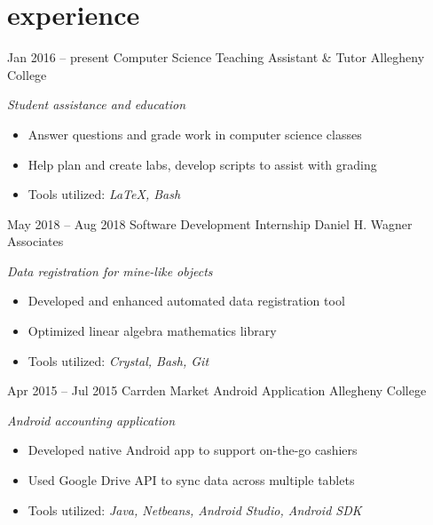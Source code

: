 \documentclass[]{friggeri-cv}
\begin{document}
\section{experience}
\begin{entrylist}
  \entry
    {Jan 2016 -- present}
    {Computer Science Teaching Assistant \& Tutor}
    {Allegheny College}
    {\emph{Student assistance and education}
    \begin{itemize}[leftmargin=1.2em]
    \item Answer questions and grade work in computer science classes
    \item Help plan and create labs, develop scripts to assist with grading
    \item Tools utilized: \emph{\LaTeX , Bash}
    \end{itemize}}
  \entry
    {May 2018 -- Aug 2018}
    {Software Development Internship}
    {Daniel H. Wagner Associates}
    {\emph{Data registration for mine-like objects}
    \begin{itemize}[leftmargin=1.2em]
    \item Developed and enhanced automated data registration tool
    \item Optimized linear algebra mathematics library
    \item Tools utilized: \emph{Crystal, Bash, Git}
    \end{itemize}}
  \entry
    {Apr 2015 -- Jul 2015}
    {Carrden Market Android Application}
    {Allegheny College}
    {\emph{Android accounting application}
    \begin{itemize}[leftmargin=1.2em]
    \item Developed native Android app to support on-the-go cashiers
    \item Used Google Drive API to sync data across multiple tablets
    \item Tools utilized: \emph{Java, Netbeans, Android Studio, Android SDK}
    \end{itemize}}
\end{entrylist}
\end{document}
